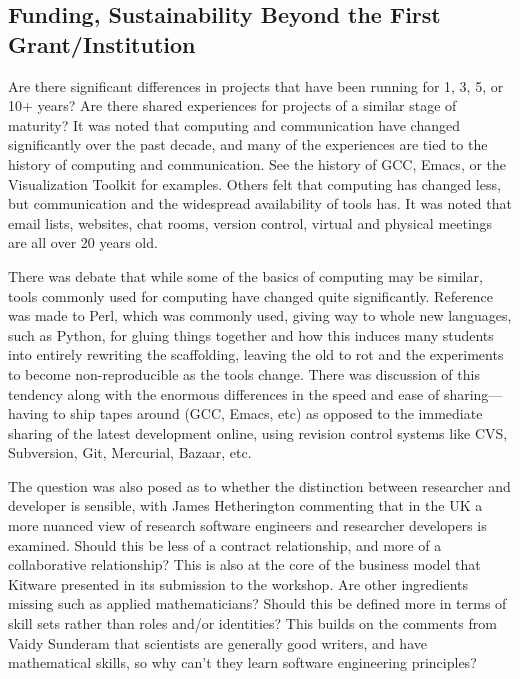 \documentclass[11pt, oneside]{amsart}
\begin{document}
\subsection{Funding, Sustainability Beyond the First Grant/Institution}

Are there significant differences in projects that have been running for 1, 3,
5, or 10+ years? Are there shared experiences for projects of a similar stage
of maturity? It was noted that computing and communication have changed
significantly over the past decade, and many of the experiences are tied to
the history of computing and communication. See the history of GCC, Emacs, or
the Visualization Toolkit for examples. Others felt that computing has changed
less, but communication and the widespread availability of tools has. It was
noted that email lists, websites, chat rooms, version control, virtual and
physical meetings are all over 20 years old.

There was debate that while some of the basics of computing may be
similar, tools commonly used for computing have changed quite
significantly. Reference was made to Perl, which was commonly used, giving way
to whole new languages, such as Python, for gluing things together and how this
induces many students into entirely rewriting the scaffolding, leaving the old
to rot and the experiments to become non-reproducible as the tools change.
 There was
discussion of this tendency along with the enormous differences in the speed and
ease of sharing---having to ship tapes around (GCC, Emacs, etc) as opposed to
the immediate sharing of the latest development online, using revision control
systems like CVS, Subversion, Git, Mercurial, Bazaar, etc.

The question was also posed as to whether the distinction between researcher
and developer is sensible, with James Hetherington commenting that in the UK
a more nuanced view of research software engineers
and researcher developers is examined. Should this be less of a contract relationship, and
more of a collaborative relationship? This is also at the core of the business
model that Kitware presented in its submission to the workshop. Are other
ingredients missing such as applied mathematicians? Should this be defined more
in terms of skill sets rather than roles and/or identities? This builds on the
comments from Vaidy Sunderam that scientists are generally good writers, and
have mathematical skills, so why can't they learn software engineering
principles?
\end{document}
